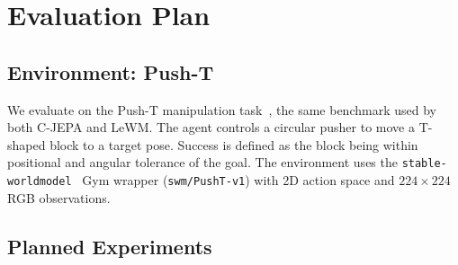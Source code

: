 \documentclass[12pt]{article}
\begin{document}
\section{Evaluation Plan}
\label{sec:eval}

\subsection{Environment: Push-T}

We evaluate on the Push-T manipulation task~\citep{chi2023diffusion}, the same benchmark used by both C-JEPA and LeWM. The agent controls a circular pusher to move a T-shaped block to a target pose. Success is defined as the block being within positional and angular tolerance of the goal. The environment uses the \texttt{stable-worldmodel}~\citep{maes2026lewm} Gym wrapper (\texttt{swm/PushT-v1}) with 2D action space and $224 \times 224$ RGB observations.

\subsection{Planned Experiments}
\end{document}
